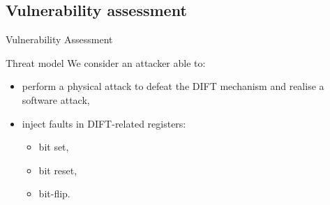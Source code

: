 \subsection{Vulnerability assessment}
\begin{frame}{Vulnerability Assessment}
    \begin{block}{Threat model}
        We consider an attacker able to:
        \begin{itemize}
            \item perform a physical attack to defeat the DIFT mechanism and realise a software attack,
            \item inject faults in DIFT-related registers:
                  \begin{itemize}
                      \item bit set,
                      \item bit reset,
                      \item bit-flip.
                  \end{itemize}
        \end{itemize}
    \end{block}

\end{frame}
